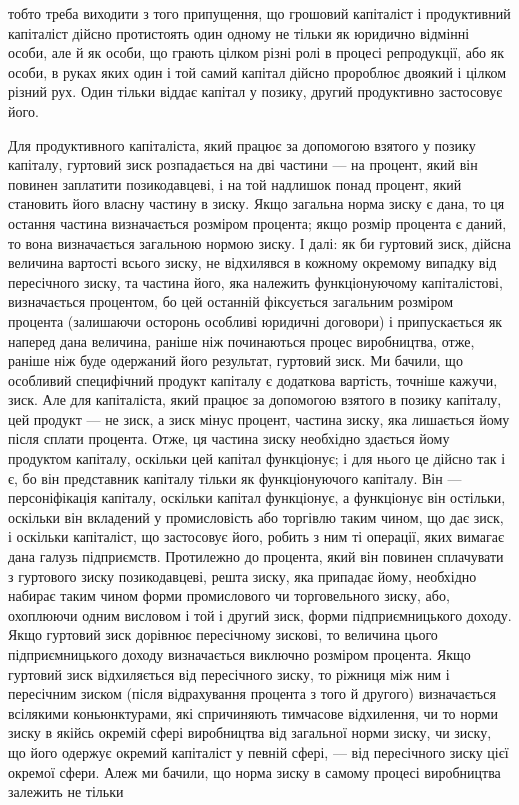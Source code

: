 тобто треба виходити з того припущення, що грошовий капіталіст
і продуктивний капіталіст дійсно протистоять один одному
не тільки як юридично відмінні особи, але й як особи, що грають
цілком різні ролі в процесі репродукції, або як особи, в руках
яких один і той самий капітал дійсно пророблює двоякий і цілком
різний рух. Один тільки віддає капітал у позику, другий
продуктивно застосовує його.

Для продуктивного капіталіста, який працює за допомогою взятого
у позику капіталу, гуртовий зиск розпадається на дві частини
— на процент, який він повинен заплатити позикодавцеві, і на
той надлишок понад процент, який становить його власну частину
в зиску. Якщо загальна норма зиску є дана, то ця остання частина
визначається розміром процента; якщо розмір процента є даний,
то вона визначається загальною нормою зиску. І далі: як би гуртовий
зиск, дійсна величина вартості всього зиску, не відхилявся
в кожному окремому випадку від пересічного зиску, та частина
його, яка належить функціонуючому капіталістові, визначається
процентом, бо цей останній фіксується загальним розміром процента
(залишаючи осторонь особливі юридичні договори) і припускається
як наперед дана величина, раніше ніж починаються
процес виробництва, отже, раніше ніж буде одержаний його результат,
гуртовий зиск. Ми бачили, що особливий специфічний продукт
капіталу є додаткова вартість, точніше кажучи, зиск. Але для
капіталіста, який працює за допомогою взятого в позику капіталу,
цей продукт — не зиск, а зиск мінус процент, частина зиску, яка
лишається йому після сплати процента. Отже, ця частина зиску
необхідно здається йому продуктом капіталу, оскільки цей капітал
функціонує; і для нього це дійсно так і є, бо він представник
капіталу тільки як функціонуючого капіталу. Він — персоніфікація
капіталу, оскільки капітал функціонує, а функціонує він
остільки, оскільки він вкладений у промисловість або торгівлю
таким чином, що дає зиск, і оскільки капіталіст, що застосовує
його, робить з ним ті операції, яких вимагає дана галузь підприємств.
Протилежно до процента, який він повинен сплачувати
з гуртового зиску позикодавцеві, решта зиску, яка
припадає йому, необхідно набирає таким чином форми промислового
чи торговельного зиску, або, охоплюючи одним висловом
і той і другий зиск, форми підприємницького доходу. Якщо
гуртовий зиск дорівнює пересічному зискові, то величина цього
підприємницького доходу визначається виключно розміром процента.
Якщо гуртовий зиск відхиляється від пересічного зиску,
то ріжниця між ним і пересічним зиском (після відрахування
процента з того й другого) визначається всілякими коньюнктурами,
які спричиняють тимчасове відхилення, чи то норми зиску
в якійсь окремій сфері виробництва від загальної норми зиску,
чи зиску, що його одержує окремий капіталіст у певній сфері, —
від пересічного зиску цієї окремої сфери. Алеж ми бачили, що
норма зиску в самому процесі виробництва залежить не тільки
